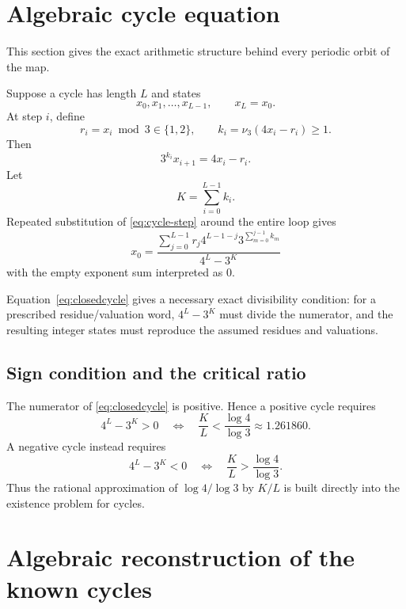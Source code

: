 \documentclass[11pt]{article}
\newcommand{\vthree}{\nu_3}
\begin{document}
\section{Algebraic cycle equation}
This section gives the exact arithmetic structure behind every periodic orbit of the map.

Suppose a cycle has length $L$ and states
\[
x_0,x_1,\ldots,x_{L-1},\qquad x_L=x_0.
\]
At step $i$, define
\[
r_i=x_i\bmod3\in\{1,2\},
\qquad
k_i=\vthree(4x_i-r_i)\ge1.
\]
Then
\begin{equation}
3^{k_i}x_{i+1}=4x_i-r_i.
\label{eq:cycle-step}
\end{equation}
Let
\begin{equation}
K=\sum_{i=0}^{L-1}k_i.
\end{equation}
Repeated substitution of \eqref{eq:cycle-step} around the entire loop gives
\begin{equation}
\boxed{
 x_0=
 \frac{\displaystyle
 \sum_{j=0}^{L-1} r_j4^{L-1-j}
 3^{\sum_{m=0}^{j-1}k_m}}
 {4^L-3^K}
 }
\label{eq:closedcycle}
\end{equation}
with the empty exponent sum interpreted as $0$.

Equation~\eqref{eq:closedcycle} gives a necessary exact divisibility condition: for a prescribed residue/valuation word, $4^L-3^K$ must divide the numerator, and the resulting integer states must reproduce the assumed residues and valuations.

\subsection{Sign condition and the critical ratio}
The numerator of \eqref{eq:closedcycle} is positive.  Hence a positive cycle requires
\begin{equation}
4^L-3^K>0
\quad\Longleftrightarrow\quad
\frac KL<\frac{\log4}{\log3}
\approx1.261860.
\label{eq:positivecondition}
\end{equation}
A negative cycle instead requires
\begin{equation}
4^L-3^K<0
\quad\Longleftrightarrow\quad
\frac KL>\frac{\log4}{\log3}.
\label{eq:negativecondition}
\end{equation}
Thus the rational approximation of $\log4/\log3$ by $K/L$ is built directly into the existence problem for cycles.

\section{Algebraic reconstruction of the known cycles}
\end{document}

